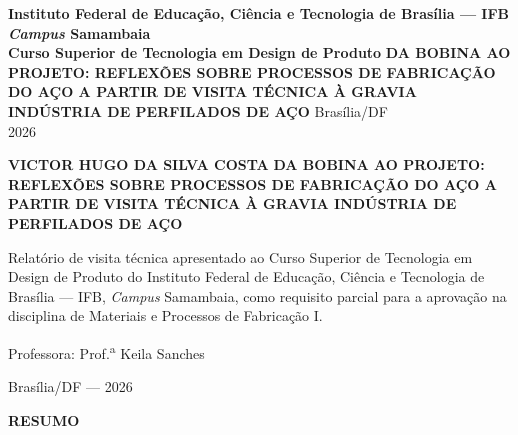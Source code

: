 \documentclass[12pt,a4paper,oneside,brazil,chapter=TITLE]{article}
\date{}
\begin{document}
\begin{titlepage}
  \thispagestyle{empty}
  \begin{center}
    {\normalsize\bfseries
      Instituto Federal de Educação, Ciência e Tecnologia de Brasília --- IFB\\[0.3em]
      \textit{Campus} Samambaia\\[0.3em]
      Curso Superior de Tecnologia em Design de Produto
    }
    \vfill
    {\large\bfseries DA BOBINA AO PROJETO: REFLEXÕES SOBRE PROCESSOS DE FABRICAÇÃO DO AÇO A PARTIR DE VISITA TÉCNICA À GRAVIA INDÚSTRIA DE PERFILADOS DE AÇO}
    \vfill
    {\normalsize Brasília/DF\\2026}
  \end{center}
\end{titlepage}
\setcounter{page}{2}

\begin{titlepage}
  \thispagestyle{empty}
  \begin{center}
    {\normalsize\bfseries VICTOR HUGO DA SILVA COSTA}
    \vfill
    {\large\bfseries DA BOBINA AO PROJETO: REFLEXÕES SOBRE PROCESSOS DE FABRICAÇÃO DO AÇO A PARTIR DE VISITA TÉCNICA À GRAVIA INDÚSTRIA DE PERFILADOS DE AÇO}
    \vfill
    \begin{flushright}
      \begin{minipage}{0.5\textwidth}
        \normalsize
        Relatório de visita técnica apresentado ao Curso Superior de Tecnologia em Design de Produto do Instituto Federal de Educação, Ciência e Tecnologia de Brasília --- IFB, \textit{Campus} Samambaia, como requisito parcial para a aprovação na disciplina de Materiais e Processos de Fabricação I.
        \vspace{1em}

        Professora: Prof.\textsuperscript{a} Keila Sanches
      \end{minipage}
    \end{flushright}
    \vfill
    {\normalsize Brasília/DF --- 2026}
  \end{center}
\end{titlepage}

\clearpage
\thispagestyle{fancy}
\begin{center}
  {\normalsize\bfseries RESUMO}
\end{center}
\vspace{12pt}
\end{document}
